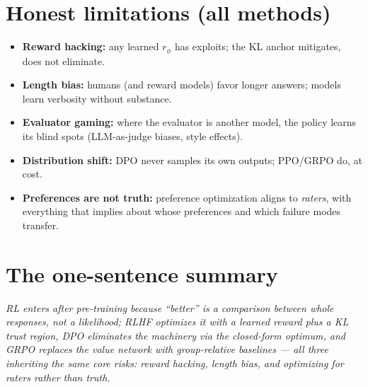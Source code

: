 \documentclass[11pt]{article}
\begin{document}
\section{Honest limitations (all methods)}
\begin{itemize}[noitemsep]
\item \textbf{Reward hacking:} any learned $r_\phi$ has exploits; the KL anchor mitigates, does not eliminate.
\item \textbf{Length bias:} humans (and reward models) favor longer answers; models learn verbosity without substance.
\item \textbf{Evaluator gaming:} where the evaluator is another model, the policy learns its blind spots (LLM-as-judge biases, style effects).
\item \textbf{Distribution shift:} DPO never samples its own outputs; PPO/GRPO do, at cost.
\item \textbf{Preferences are not truth:} preference optimization aligns to \emph{raters}, with everything that implies about whose preferences and which failure modes transfer.
\end{itemize}

\section*{The one-sentence summary}
\emph{RL enters after pre-training because ``better'' is a comparison between whole responses, not a likelihood; RLHF optimizes it with a learned reward plus a KL trust region, DPO eliminates the machinery via the closed-form optimum, and GRPO replaces the value network with group-relative baselines --- all three inheriting the same core risks: reward hacking, length bias, and optimizing for raters rather than truth.}



\end{document}
